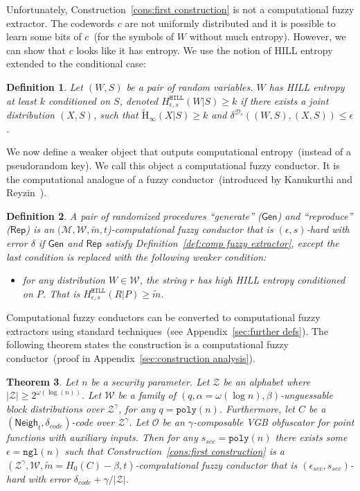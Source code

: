 \documentclass[11pt]{article}
\newcommand{\apref}[1]{\mbox{Appendix~\ref{#1}}}
\newcommand{\defref}[1]{\mbox{Definition~\ref{#1}}}
\newcommand{\consref}[1]{\mbox{Construction~\ref{#1}}}
\newcommand{\class}[1]{{\ensuremath{\mathsf{#1}}}}
\newcommand{\gen}{\ensuremath{\class{Gen}}\xspace}
\newcommand{\rep}{\ensuremath{\class{Rep}}\xspace}
\newcommand{\neigh}{\ensuremath{\class{Neigh}}\xspace}
\newcommand{\hill}{\ensuremath{\mathtt{HILL}}\xspace}
\newcommand{\poly}{\ensuremath{\mathtt{poly}}\xspace}
\newcommand{\ngl}{\ensuremath{\mathtt{ngl}}\xspace}
\newcommand{\Hav}{\tilde{\mathrm{H}}_\infty}
\newtheorem{theorem}{Theorem}[section]
\newtheorem{definition}[theorem]{Definition}
\begin{document}
Unfortunately, \consref{cons:first construction} is not a computational fuzzy extractor.  The codewords $c$ are not uniformly distributed and it is possible to learn some bits of $c$~(for the symbols of $W$ without much entropy).  However, we can show that $c$ looks like it has entropy.  We use the notion of HILL entropy~\cite{DBLP:journals/siamcomp/HastadILL99} extended to the conditional case:
\begin{definition}
\label{def:hill ent}
Let $(W, S)$ be a pair of random variables.  $W$ has
\emph{HILL entropy} at least $k$ conditioned on $S$,
denoted $H^{\hill}_{\epsilon, s}(W|S)\geq k$ if there exists a joint distribution $(X, S)$, such that $\Hav(X|S)\geq k$ and $\delta^{\mathcal{D}_{s}} ((W, S),(X,S))\leq \epsilon$.
\end{definition} 
We now define a weaker object that outputs computational entropy~(instead of a pseudorandom key).  We call this object a computational fuzzy conductor.  It is the computational analogue of a fuzzy conductor~(introduced by Kanukurthi and Reyzin~\cite{KanukurthiR09}).
\begin{definition}
\label{def:comp fuzzy cond}
A pair of randomized procedures ``generate'' ($\gen$) and ``reproduce'' ($\rep$) is an $(\mathcal{M}, \mathcal{W}, \tilde{m}, t$)-computational fuzzy conductor that is $(\epsilon, s)$-hard with error $\delta$ if $\gen$ and $\rep$ satisfy \defref{def:comp fuzzy extractor}, except the last condition is replaced with the following weaker condition:
\begin{itemize}
\item for any distribution $W\in \mathcal{W}$, the string $r$ has high HILL entropy conditioned on $P$.  That is $H^{\hill}_{\epsilon, s}(R |P)\geq \tilde{m}$.
\end{itemize}
\end{definition}
Computational fuzzy conductors can be converted to computational fuzzy extractors using standard techniques~(see \apref{sec:further defs}).
The following theorem states the construction is a computational fuzzy conductor~(proof in \apref{sec:construction analysis}).  
\begin{theorem}
\label{thm:main thm first cons}
Let $n$ be a security parameter. Let $\mathcal{Z}$ be an alphabet where $|\mathcal{Z}| \ge 2^{ \omega(\log(n))}$.
Let $\mathcal{W}$ be a family of $(q,\alpha= \omega(\log n),  \beta)$-unguessable block distributions over $\mathcal{Z}^\gamma$, for any $q = \poly(n)$.  Furthermore, let $C$ be a $(\neigh_t, \delta_{code})$-code over $\mathcal{Z}^\gamma$.  Let $\mathcal{O}$ be an $\gamma$-composable VGB obfuscator for point functions with auxiliary inputs. Then for any $s_{sec} = \poly(n)$ there exists some $\epsilon=\ngl(n)$ such that \consref{cons:first construction} is a $(\mathcal{Z}^\gamma, \mathcal{W}, \tilde{m}=H_0(C)-\beta, t)$-computational fuzzy conductor that is $(\epsilon_{sec}, s_{sec})$-hard with error $\delta_{code} + \gamma/|\mathcal{Z}|$.
\end{theorem}
\end{document}
